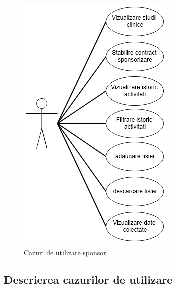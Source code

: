 \documentclass[12pt,a4paper,twoside]{report}
\begin{document}
	\begin{figure}[H]
		\begin{center}
			\includegraphics[scale=0.5]{img/uc_spon.PNG}
			\caption{Cazuri de utilizare sponsor}
  			\label{fig:ucs}
  		\end{center}
  	\end{figure}


\subsection{Descrierea cazurilor de utilizare}
  		
\end{document}
